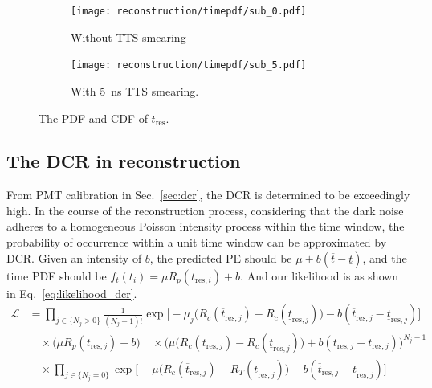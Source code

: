 \begin{figure}[htbp]
	\centering
	\begin{subfigure}{0.5\textwidth}
		\centering
		\texttt{[image: reconstruction/timepdf/sub\_0.pdf]}
		\caption{Without TTS smearing}
		\label{fig:smear0}
	\end{subfigure}%
	\begin{subfigure}{0.5\textwidth}
		\centering
		\texttt{[image: reconstruction/timepdf/sub\_5.pdf]}
		\caption{With \SI{5}{ns} TTS smearing.}
		\label{fig:smear5}
	\end{subfigure}
	\caption{The PDF and CDF of $t_{\mathrm{res}}$.}
	\label{fig:time}
\end{figure}

\subsection{The DCR in reconstruction}
From PMT calibration in Sec.~\ref{sec:dcr}, the DCR is determined to be exceedingly high. In the course of the reconstruction process, considering that the dark noise adheres to a homogeneous Poisson intensity process within the time window, the probability of occurrence within a unit time window can be approximated by DCR. Given an intensity of $b$, the predicted PE should be $\mu+b(\overline{t}-\underline{t})$, and the time PDF should be $f_t(t_i)=\mu R_p(t_{\mathrm{res},i})+b$. And our likelihood is as shown in Eq.~\eqref{eq:likelihood_dcr}.
\begin{equation}
	\begin{aligned}
		\mathcal{L}
		 & = \prod_{j \in \{N_j>0\}} \frac{1}{(N_j-1)!}
		\exp\Big[ -\mu_j\big(R_c(\overline{t}_{\mathrm{res},j}) - R_c(\underline{t}_{\mathrm{res},j})\big) - b(\overline{t}_{\mathrm{res},j}-\underline{t}_{\mathrm{res},j})\Big]                                          \\
		 & \quad \times \big( \mu R_p(t_{\mathrm{res},j})+b \big)
		\quad \times \Big( \mu \big( R_c(\overline{t}_{\mathrm{res},j}) - R_c(\underline{t}_{\mathrm{res},j}) \big) + b(\overline{t}_{\mathrm{res},j} - t_{\mathrm{res},j}) \Big)^{N_j-1}                                  \\
		 & \quad \times \prod_{j \in \{N_j=0\}} \exp\Big[ -\mu\big(R_c(\overline{t}_{\mathrm{res},j}) - R_T(\underline{t}_{\mathrm{res},j})\big) - b(\overline{t}_{\mathrm{res},j} - \underline{t}_{\mathrm{res},j}) \Big]
	\end{aligned}
	\label{eq:likelihood_dcr}
\end{equation}

